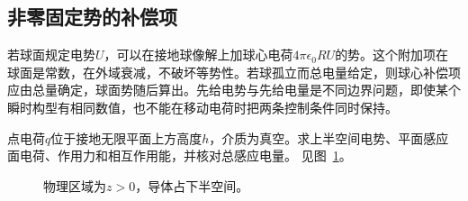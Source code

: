 \subsection{非零固定势的补偿项}
若球面规定电势$U$，可以在接地球像解上加球心电荷$4\pi\epsilon_0RU$的势。这个附加项在球面是常数，在外域衰减，不破坏等势性。若球孤立而总电量给定，则球心补偿项应由总量确定，球面势随后算出。先给电势与先给电量是不同边界问题，即使某个瞬时构型有相同数值，也不能在移动电荷时把两条控制条件同时保持。

\begin{example}[接地平面的力与能量]\label{ex:es3-e1}
点电荷$q$位于接地无限平面上方高度$h$，介质为真空。求上半空间电势、平面感应面电荷、作用力和相互作用能，并核对总感应电量。 见图~\ref{fig:es3-e1-q}。
\end{example}

\begin{figure}[H]\centering
{}
\caption{物理区域为$z>0$，导体占下半空间。}\label{fig:es3-e1-q}
\end{figure}
